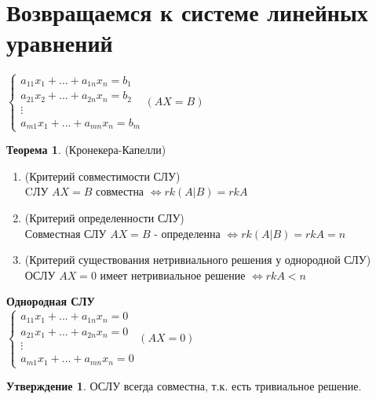 \documentclass[a4paper, 12pt]{article}
\theoremstyle{definition}
\newtheorem*{theorem}{Теорема}
\newtheorem*{subtheorem}{Утверждение}
\begin{document}
  \section{Возвращаемся к системе линейных уравнений}
  $\begin{cases}
    a_{11}x_1 + ... + a_{1n}x_n = b_1 \\ 
    a_{21}x_2 + ... + a_{2n}x_n = b_2 \\
    \vdots \\
    a_{m1}x_1 + ... + a_{mn}x_n = b_m
  \end{cases} (AX = B)$
  \begin{theorem} (Кронекера-Капелли)
    \begin{enumerate}
      \item (Критерий совместимости СЛУ) \\ CЛУ $AX = B$ совместна $\Longleftrightarrow rk(A|B) = rkA$ 
      \item (Критерий определенности СЛУ) \\ Совместная СЛУ $AX =B$ - определенна $\Longleftrightarrow rk(A|B) = rkA = n$ 
      \item (Критерий существования нетривиального решения у однородной СЛУ) \\ ОСЛУ $AX = 0$ имеет нетривиальное решение $\Longleftrightarrow rkA<n$ 
    \end{enumerate}
  \end{theorem}
  \textbf{Однородная СЛУ} \\  
  $\begin{cases}
    a_{11}x_1 + ... + a_{1n}x_n = 0 \\ 
    a_{21}x_1 + ... + a_{2n}x_n = 0 \\
    \vdots \\
    a_{m1}x_1 + ... + a_{mn}x_n = 0
  \end{cases} (AX = 0)$
  \begin{subtheorem}
    ОСЛУ всегда совместна, т.к. есть тривиальное решение.
  \end{subtheorem} 
\end{document}
